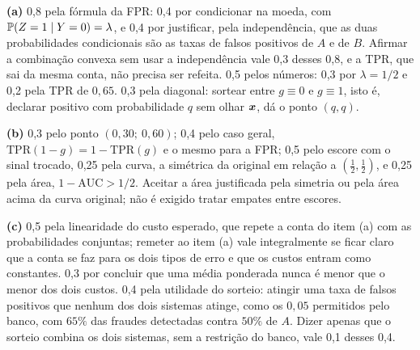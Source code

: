 \documentclass[11pt,a4paper]{article}
\begin{document}



\begin{criterio}
\textbf{(a)} 0,8 pela fórmula da FPR: 0,4 por condicionar na moeda, com
$\mathbb{P}(Z=1\mid Y=0)=\lambda$, e 0,4 por justificar, pela independência, que as duas
probabilidades condicionais são as taxas de falsos positivos de $A$ e de $B$. Afirmar a
combinação convexa sem usar a independência vale 0,3 desses 0,8, e a TPR, que sai da
mesma conta, não precisa ser refeita. 0,5 pelos números: 0,3 por $\lambda=1/2$ e 0,2 pela
TPR de $0{,}65$. 0,3 pela diagonal: sortear entre $g\equiv0$ e $g\equiv1$, isto é, declarar
positivo com probabilidade $q$ sem olhar $\bm{x}$, dá o ponto $(q,q)$.

\textbf{(b)} 0,3 pelo ponto $(0{,}30;\ 0{,}60)$; 0,4 pelo caso geral,
$\mathrm{TPR}(1-g)=1-\mathrm{TPR}(g)$ e o mesmo para a FPR; 0,5 pelo escore com o sinal
trocado, 0,25 pela curva, a simétrica da original em relação a $(\tfrac12,\tfrac12)$, e
0,25 pela área, $1-\mathrm{AUC}>1/2$. Aceitar a área justificada pela simetria ou pela
área acima da curva original; não é exigido tratar empates entre escores.

\textbf{(c)} 0,5 pela linearidade do custo esperado, que repete a conta do item (a) com
as probabilidades conjuntas; remeter ao item (a) vale integralmente se ficar claro que
a conta se faz para os dois tipos de erro e que os custos entram como constantes. 0,3
por concluir que uma média ponderada nunca é menor que o menor dos dois custos. 0,4 pela
utilidade do sorteio: atingir uma taxa de falsos positivos que nenhum dos dois sistemas
atinge, como os $0{,}05$ permitidos pelo banco, com $65\%$ das fraudes detectadas contra
$50\%$ de $A$. Dizer apenas que o sorteio combina os dois sistemas, sem a restrição do
banco, vale 0,1 desses 0,4.
\end{criterio}
\end{document}

